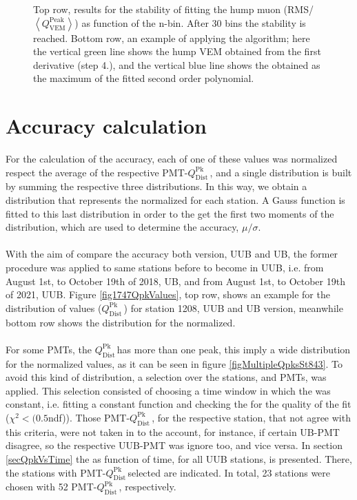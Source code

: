 \documentclass[twoside, final, 10pt]{articleMine}
\newcommand{\qpkDist}{$Q^\mathrm{Pk}_\mathrm{Dist}$\,}
\begin{document}
\begin{figure}[!t]
  \centering
  \caption{Top row, results for the stability of fitting the hump
  muon (RMS/$\left<Q^\mathrm{Peak}_\mathrm{VEM}\right>$) as
  function of the n-bin. After 30 bins the stability is reached.
  Bottom row, an example of applying the algorithm; here the
  vertical green line shows the hump VEM obtained from the first
  derivative (step 4.), and the vertical blue line shows the
  \qpkvem obtained as the maximum of the fitted second order
  polynomial.}
  \label{figApplyingAlgorithm}
\end{figure}

\section{Accuracy calculation}

For the calculation of the \qpkvem accuracy, each of one of these
values was normalized respect the average of the respective
PMT-\qpkDist, and a single distribution is built by summing the
respective three distributions. In this way, we obtain a
distribution that represents the \qpkvem normalized for each
station. A Gauss function is fitted to this last distribution in
order to the get the first two moments of the distribution, which
are used to determine the accuracy, $\mu/\sigma$.\\\\With the aim
of compare the accuracy both version, UUB and UB, the former
procedure was applied to same stations before to become in UUB,
i.e. from August 1st, to October 19th of 2018, UB, and from
August 1st, to October 19th of 2021, UUB. Figure
\ref{fig1747QpkValues}, top row, shows an example for the
distribution of \qpkvem values (\qpkDist) for station 1208, UUB
and UB version, meanwhile bottom row shows the distribution for
the \qpkvem normalized.\\\\For some PMTs, the \qpkDist has more
than one peak, this imply a wide distribution for the normalized
values, as it can be seen in figure \ref{figMultipleQpksSt843}.
To avoid this kind of distribution, a selection over the
stations, and PMTs, was applied. This selection consisted of
choosing a time window in which the \qpkvem was constant, i.e.
fitting a constant function and checking the for the quality of
the fit ($\chi^2<(0.5$ndf)). Those PMT-\qpkDist, for the
respective station, that not agree with this criteria, were not
taken in to the account, for instance, if certain UB-PMT
disagree, so the respective UUB-PMT was ignore too, and vice
versa. In section \ref{secQpkVsTime} the \qpkvem as function of
time, for all UUB stations, is presented. There, the stations
with PMT-\qpkDist selected are indicated. In total, 23 stations
were chosen with 52 PMT-\qpkDist, respectively.
\clearpage
\end{document}
